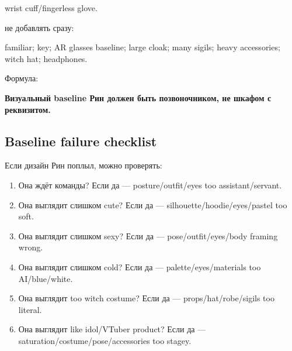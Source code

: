 wrist cuff/\hspace{0pt}fingerless glove.

не добавлять сразу:

familiar; key; AR glasses baseline; large cloak; many sigils; heavy
accessories; witch hat; headphones.

Формула:

\textbf{Визуальный baseline Рин должен быть позвоночником, не шкафом с
реквизитом.}

\subsection*{Baseline failure checklist}

Если дизайн Рин поплыл, можно проверять:

\begin{enumerate}
\def\labelenumi{\arabic{enumi}.}
\item
  Она ждёт команды? Если да --- posture/\hspace{0pt}outfit/\hspace{0pt}eyes too
  assistant/\hspace{0pt}servant.
\item
  Она выглядит слишком cute? Если да --- silhouette/\hspace{0pt}hoodie/\hspace{0pt}eyes/\hspace{0pt}pastel
  too soft.
\item
  Она выглядит слишком sexy? Если да --- pose/\hspace{0pt}outfit/\hspace{0pt}eyes/\hspace{0pt}body framing
  wrong.
\item
  Она выглядит слишком cold? Если да --- palette/\hspace{0pt}eyes/\hspace{0pt}materials too
  AI/\hspace{0pt}blue/\hspace{0pt}white.
\item
  Она выглядит too witch costume? Если да --- props/\hspace{0pt}hat/\hspace{0pt}robe/\hspace{0pt}sigils too
  literal.
\item
  Она выглядит like idol/\hspace{0pt}VTuber product? Если да ---
  saturation/\hspace{0pt}costume/\hspace{0pt}pose/\hspace{0pt}accessories too stagey.

\end{enumerate}
